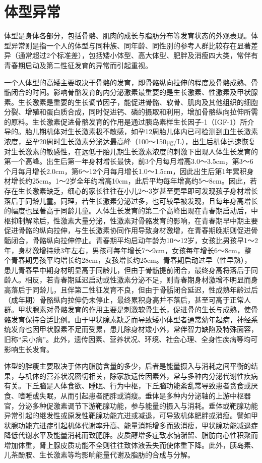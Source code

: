 \chapter{体型异常}

体型是身体各部分，包括骨骼、肌肉的成长与脂肪分布等发育状态的外观表现。体型异常则是指一个人的体型与同种族、同年龄、同性别的参考人群比较存在显著差异（通常超过2个标准差），包括矮小体型、高大体型、肥胖及消瘦四大类，常伴有青春期启动及第二性征发育的异常而引起重视。

一个人体型的高矮主要取决于骨骼的发育，即骨骼纵向拉伸的程度及骨骼成熟、骨骺闭合的时间。影响骨骼发育的内分泌激素最重要的是生长激素、性激素及甲状腺素。生长激素是重要的生长调节因子，能促进骨骼、软骨、肌肉及其他组织的细胞分裂、增殖和蛋白质合成，同时促进钙、磷的摄取和利用，增加骨骼纵向拉伸所需的原料。生长激素促进骨骼发育的作用是通过胰岛素样生长因子-1（IGF-1）所介导的。胎儿期机体对生长激素极不敏感，如孕12周胎儿体内已可检测到血生长激素浓度，至孕20周时生长激素分泌达最高峰（100～150μg/L），出生后机体迅速恢复对生长激素的敏感性，在远低于胎儿期生长激素浓度的刺激下出现人体生长发育的第一个高峰。出生后第一年身材增长最快，前3个月每月增高3.0～3.5cm，第3～6个月每月增长2.0cm，第6～12个月每月增长1.0～1.5cm，因此出生后第1年累积身材增长约25cm。1～2岁全年约增高10cm，此后平均每年增高约5～8cm。因此，若存在生长激素缺乏，细心的家长往往在小儿2～3岁甚至更早即可发现孩子身材增长落后于同龄儿童。同理，若生长激素分泌过多，也可较早被发现，且每年身高增长的幅度也显著高于同龄儿童。人体生长发育的第二个高峰出现在青春期启动后，中枢抑制解除后，性激素大量分泌，性激素对骨骼发育的影响，在青春期早中期主要促进骨骼的纵向拉伸，与生长激素协同作用导致身材激增，在青春期晚期则促进骨骺闭合，骨骼纵向拉伸停止。青春期平均启动年龄为10～12岁，女孩比男孩早1～2年，身材激增持续3年左右，男孩可每年增长7～9cm，女孩每年增长6～8cm，整个青春期男孩平均增长约28cm，女孩增长约25cm。青春期启动过早（性早熟），患儿青春早中期身材明显高于同龄儿，但由于骨骺提前闭合，最终身高将落后于同龄人。相反，若青春期延迟启动或性激素分泌不足，则青春期身材激增不明显而身高落后于同龄儿，且伴第二性征发育不良，但由于骨骺闭合延迟，性成熟年龄过后（成年期）骨骼纵向拉伸仍未停止，最终累积身高并不落后，甚至可高于正常人群。甲状腺素对骨骼发育的作用主要是刺激软骨生长，促进骨的生长与成熟，使骨骼发育保持合适比例。由于甲状腺素缺乏而导致矮小体型者通常幼年起病，神经系统发育也因甲状腺素不足而受累，患儿除身材矮小外，常伴智力缺陷及特殊面容，旧称“呆小病”。此外，遗传因素、营养状况、环境、社会心理、全身性疾病等均可影响生长发育。

体型的胖瘦主要取决于体内脂肪含量的多少，后者是能量摄入与消耗之间平衡的结果，与机体的营养状况密切相关，除家族遗传因素外，常与多种内分泌代谢性疾病有关。下丘脑是人体食欲、睡眠、行为中枢，下丘脑功能紊乱常导致患者贪食或厌食、嗜睡或失眠，从而引起患者肥胖或消瘦。垂体是多种内分泌轴的上游中枢器官，分泌多种促激素调节下游靶腺功能，参与能量的摄入与消耗。垂体或靶腺功能异常引起的继发性或原发性靶腺功能亢进或减退，可导致机体肥胖或消瘦。譬如甲状腺功能亢进症引起机体代谢率升高、能量消耗增多而致消瘦，甲状腺功能减退症降低代谢水平及能量消耗而致肥胖。皮质醇增多症致水钠潴留、脂肪向心性积聚而增加体重，肾上腺皮质功能不全则往往致体液丢失而使体重下降。此外，胰岛素、儿茶酚胺、生长激素等均影响能量代谢及脂肪的合成与分解。

